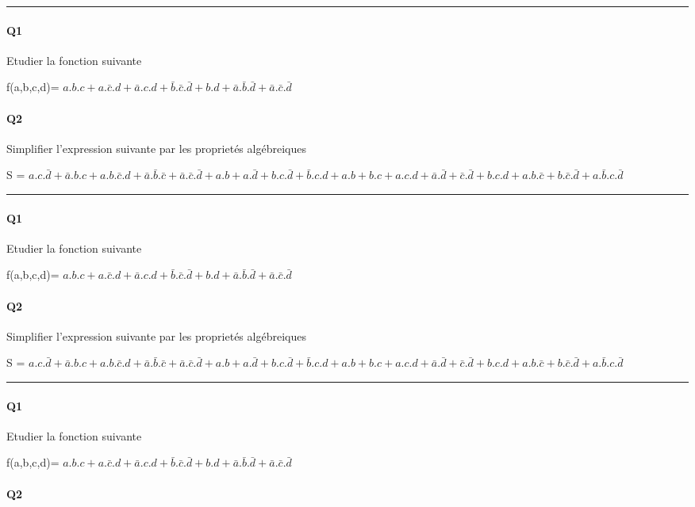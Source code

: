 \hrule width 1\linewidth
\paragraph{Q1}

Etudier la fonction suivante

f(a,b,c,d)= $a.b.c+a.\bar c.d+\bar a.c.d+\bar b.\bar c.\bar d + b.d+\bar a.\bar b.\bar d+\bar a.\bar c.\bar d$

\paragraph{Q2}

Simplifier l'expression suivante par les proprietés algébreiques 

S = $a.c.\bar d+\bar a.b.c+a.b.\bar c.d+\bar a.\bar b.\bar c+\bar a.\bar c.\bar d + a.b+a.\bar d+b.c.\bar d+\bar b.c.d + a.b+b.c+a.c.d+\bar a.\bar d+\bar c.\bar d + b.c.d+a.b.\bar c+b.\bar c.\bar d+a.\bar b.c.\bar d$

\hrule width 1\linewidth
\paragraph{Q1}

Etudier la fonction suivante

f(a,b,c,d)= $a.b.c+a.\bar c.d+\bar a.c.d+\bar b.\bar c.\bar d + b.d+\bar a.\bar b.\bar d+\bar a.\bar c.\bar d$

\paragraph{Q2}

Simplifier l'expression suivante par les proprietés algébreiques 

S = $a.c.\bar d+\bar a.b.c+a.b.\bar c.d+\bar a.\bar b.\bar c+\bar a.\bar c.\bar d + a.b+a.\bar d+b.c.\bar d+\bar b.c.d + a.b+b.c+a.c.d+\bar a.\bar d+\bar c.\bar d + b.c.d+a.b.\bar c+b.\bar c.\bar d+a.\bar b.c.\bar d$

\hrule width 1\linewidth
\paragraph{Q1}

Etudier la fonction suivante

f(a,b,c,d)= $a.b.c+a.\bar c.d+\bar a.c.d+\bar b.\bar c.\bar d + b.d+\bar a.\bar b.\bar d+\bar a.\bar c.\bar d$

\paragraph{Q2}

